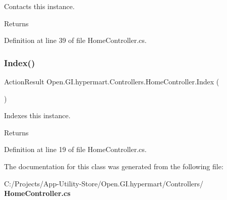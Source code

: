Contacts this instance. 

\begin{DoxyReturn}{Returns}

\end{DoxyReturn}


Definition at line 39 of file Home\+Controller.\+cs.

\mbox{\label{class_open_1_1_g_i_1_1hypermart_1_1_controllers_1_1_home_controller_a18ad180258caf702a7cfe51c16bf5558}} 
\subsubsection{Index()}
{\footnotesize\ttfamily Action\+Result Open.\+G\+I.\+hypermart.\+Controllers.\+Home\+Controller.\+Index (\begin{DoxyParamCaption}{ }\end{DoxyParamCaption})}



Indexes this instance. 

\begin{DoxyReturn}{Returns}

\end{DoxyReturn}


Definition at line 19 of file Home\+Controller.\+cs.



The documentation for this class was generated from the following file\+:\begin{DoxyCompactItemize}
\item 
C\+:/\+Projects/\+App-\/\+Utility-\/\+Store/\+Open.\+G\+I.\+hypermart/\+Controllers/\textbf{ Home\+Controller.\+cs}\end{DoxyCompactItemize}
